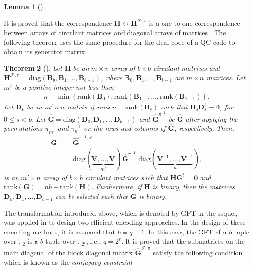 \documentclass[journal,draftclsnofoot,onecolumn,12pt,twoside]{IEEEtran}
\newtheorem{theorem}{Theorem}
\newtheorem{lemma}[theorem]{Lemma}
\begin{document}
{\begin{lemma}[\emph{\cite[Lemma 2]{C10}}]
\end{lemma}
It is proved that the correspondence $\mathbf{H}\leftrightarrow\mathbf{H}^{\mathcal{F},\pi}$  is a one-to-one correspondence between arrays of circulant matrices and diagonal arrays of matrices \cite[Theorem 1]{C10}. The following theorem uses the same procedure for the dual code of a QC code to obtain its generator matrix.
\begin{theorem}[\emph{\cite[Theorem 5]{C10}}]
  Let $\mathbf{H}$ be an $m\times n$ array of $b\times b$ circulant matrices and $\mathbf{H}^{\mathcal{F},\pi}=\mathrm{diag}\left(\mathbf{B}_{0},\mathbf{B}_1,\ldots ,\mathbf{B}_{b-1}\right)$, where $\mathbf{B}_{0},\mathbf{B}_1,\ldots ,\mathbf{B}_{b-1}$ are $m\times n$ matrices. Let $m'$ be a positive
integer not less than
\begin{eqnarray*}
  n-\min\left\{\mathrm{rank}\left(\mathbf{B}_0\right),\mathrm{rank}\left(\mathbf{B}_1\right),\ldots,\mathrm{rank}\left(\mathbf{B}_{b-1}\right)\right\}.
\end{eqnarray*}
Let $\mathbf{D_s}$ be an $m'\times n$ matrix of rank $n-\mathrm{rank}\left(\mathbf{B}_s\right)$ such that $\mathbf{B}_s\mathbf{D}_s^t=\mathbf{0}$, for $0\leq s<b$. Let $\hat{\mathbf{G}}=\mathrm{diag}\left(\mathbf{D}_0,\mathbf{D}_1,\ldots,\mathbf{D}_{b-1}\right)$ and $\hat{\mathbf{G}}^{\pi^{-1}}$ be $\hat{\mathbf{G}}$ after applying the permutations $\pi_{m'}^{-1}$ and $\pi_{n}^{-1}$ on the rows and columns of $\hat{\mathbf{G}}$, respectively. Then,
\begin{eqnarray*}
  \mathbf{G} &=& \hat{\mathbf{G}}^{\pi^{-1},\mathcal{F}} \\
             &=& \mathrm{diag}(\underbrace{\mathbf{V},\ldots,\mathbf{V}}_{m'})\,\hat{\mathbf{G}}^{\pi^{-1}}\,\, \mathrm{diag}(\underbrace{\mathbf{V}^{-1},\ldots,\mathbf{V}^{-1}}_{n}),
\end{eqnarray*}
is an $m'\times n$ array of $b\times b$ circulant matrices such that $\mathbf{H}\mathbf{G}^t=\mathbf{0}$ and $\mathrm{rank}(\mathbf{G})=nb-\mathrm{rank}(\mathbf{H})$. Furthermore, if $\mathbf{H}$ is binary,
then the matrices $\mathbf{D}_{0},\mathbf{D}_1,\ldots ,\mathbf{D}_{b-1}$ can be selected such that $\mathbf{G}$
is binary.
\end{theorem}
The transformation introduced above, which is denoted by GFT in the sequel, was applied in \cite{FFT_encoding} to design two efficient encoding approaches. In the design of these encoding methods, it is assumed that $b=q-1$. In this case, the GFT of a $b$-tuple over $\mathbb{F}_2$ is a $b$-tuple over $\mathbb{F}_{2^r}$, i.e., $q=2^r$. It is  proved that the submatrices on the main diagonal of the block diagonal matrix $\hat{\mathbf{G}}^{\mathcal{F},\pi}$ satisfy the following condition which is known as the \emph{conjugacy constraint} \cite{blahut}
}
\end{document}
